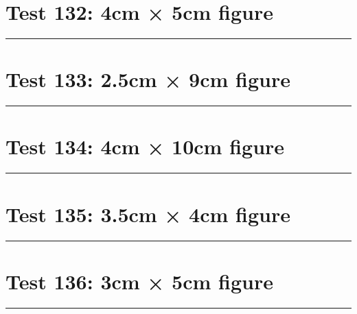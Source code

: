 \documentclass[a4paper,11pt]{article}
\begin{document}
\section*{Test 132: 4cm × 5cm figure}
\begin{swarmwrap}%
  \begin{minipage}[t]{4cm}
    \centering
    \rule{\linewidth}{5cm}
  \end{minipage}%
\end{swarmwrap}%
\swarmwrapnext
\lipsum[118]
\lipsum[119]
\lipsum[120]
\section*{Test 133: 2.5cm × 9cm figure}
\begin{swarmwrap}%
  \begin{minipage}[t]{2cm}
    \centering
    \rule{\linewidth}{9cm}
  \end{minipage}%
\end{swarmwrap}%
\swarmwrapnext
\lipsum[115]
\lipsum[116]
\lipsum[117]
\lipsum[118]
\lipsum[119]
\section*{Test 134: 4cm × 10cm figure}
\begin{swarmwrap}%
  \begin{minipage}[t]{4cm}
    \centering
    \rule{\linewidth}{10cm}
  \end{minipage}%
\end{swarmwrap}%
\swarmwrapnext
\lipsum[142]
\lipsum[143]
\lipsum[144]
\lipsum[145]
\lipsum[146]
\lipsum[147]
\section*{Test 135: 3.5cm × 4cm figure}
\begin{swarmwrap}%
  \begin{minipage}[t]{3cm}
    \centering
    \rule{\linewidth}{4cm}
  \end{minipage}%
\end{swarmwrap}%
\swarmwrapnext
\lipsum[117]
\lipsum[118]
\lipsum[119]
\lipsum[120]
\lipsum[121]
\lipsum[122]
\section*{Test 136: 3cm × 5cm figure}
\begin{swarmwrap}%
  \begin{minipage}[t]{3cm}
    \centering
    \rule{\linewidth}{5cm}
  \end{minipage}%
\end{swarmwrap}%
\swarmwrapnext
\lipsum[135]
\lipsum[136]
\lipsum[137]
\lipsum[138]
\lipsum[139]
\end{document}
